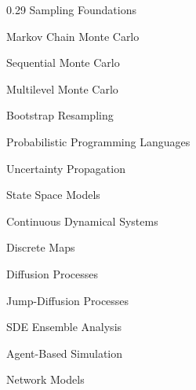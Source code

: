 \documentclass[10pt,a4paper]{article}
\begin{document}
\begin{mcol}{0.29\linewidth}
Sampling Foundations\sub\par
Markov Chain Monte Carlo\par
Sequential Monte Carlo\par
Multilevel Monte Carlo\par
Bootstrap Resampling\par
Probabilistic Programming Languages\sub\par
Uncertainty Propagation\par
State Space Models\par
Continuous Dynamical Systems\par
Discrete Maps\par
Diffusion Processes\par
Jump-Diffusion Processes\par
SDE Ensemble Analysis\par
Agent-Based Simulation\sub\par
Network Models\sub\par\vspace{6mm}
\hspace*{-7mm}
\end{mcol}
\end{document}
